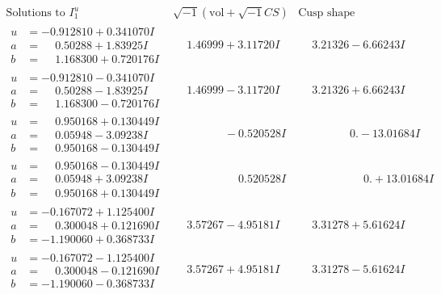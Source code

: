 \documentclass[1p]{elsarticle_modified}
\theoremstyle{definition}
\newcommand{\I}{\sqrt{-1}}
\begin{document}
$$\begin{array}{c|c|c}  
\text{Solutions to }I^u_{1}& \I (\text{vol} + \sqrt{-1}CS) & \text{Cusp shape}\\
 \hline 
\begin{aligned}
u &= -0.912810 + 0.341070 I \\
a &= \phantom{-}0.50288 + 1.83925 I \\
b &= \phantom{-}1.168300 + 0.720176 I\end{aligned}
 & \phantom{-}1.46999 + 3.11720 I & \phantom{-}3.21326 - 6.66243 I \\ \hline\begin{aligned}
u &= -0.912810 - 0.341070 I \\
a &= \phantom{-}0.50288 - 1.83925 I \\
b &= \phantom{-}1.168300 - 0.720176 I\end{aligned}
 & \phantom{-}1.46999 - 3.11720 I & \phantom{-}3.21326 + 6.66243 I \\ \hline\begin{aligned}
u &= \phantom{-}0.950168 + 0.130449 I \\
a &= \phantom{-}0.05948 - 3.09238 I \\
b &= \phantom{-}0.950168 - 0.130449 I\end{aligned}
 & \phantom{-0.000000 } -0.520528 I & \phantom{-0.000000 } 0. - 13.01684 I \\ \hline\begin{aligned}
u &= \phantom{-}0.950168 - 0.130449 I \\
a &= \phantom{-}0.05948 + 3.09238 I \\
b &= \phantom{-}0.950168 + 0.130449 I\end{aligned}
 & \phantom{-0.000000 -}0.520528 I & \phantom{-0.000000 -}0. + 13.01684 I \\ \hline\begin{aligned}
u &= -0.167072 + 1.125400 I \\
a &= \phantom{-}0.300048 + 0.121690 I \\
b &= -1.190060 + 0.368733 I\end{aligned}
 & \phantom{-}3.57267 - 4.95181 I & \phantom{-}3.31278 + 5.61624 I \\ \hline\begin{aligned}
u &= -0.167072 - 1.125400 I \\
a &= \phantom{-}0.300048 - 0.121690 I \\
b &= -1.190060 - 0.368733 I\end{aligned}
 & \phantom{-}3.57267 + 4.95181 I & \phantom{-}3.31278 - 5.61624 I \\ \hline\begin{aligned}

\end{aligned}
\end{array}$$
\end{document}
